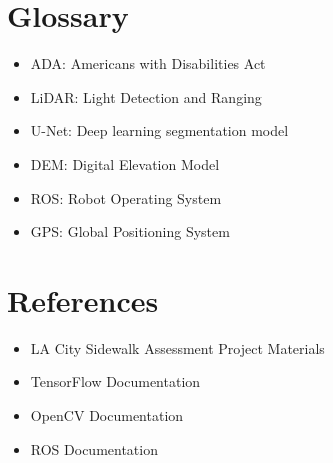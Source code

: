 \documentclass{article}
\begin{document}
\section{Glossary}

\begin{itemize}
    \item ADA: Americans with Disabilities Act
    \item LiDAR: Light Detection and Ranging
    \item U-Net: Deep learning segmentation model
    \item DEM: Digital Elevation Model
    \item ROS: Robot Operating System
    \item GPS: Global Positioning System
\end{itemize}

\section{References}

\begin{itemize}
    \item LA City Sidewalk Assessment Project Materials
    \item TensorFlow Documentation
    \item OpenCV Documentation
    \item ROS Documentation
\end{itemize}
\end{document}
